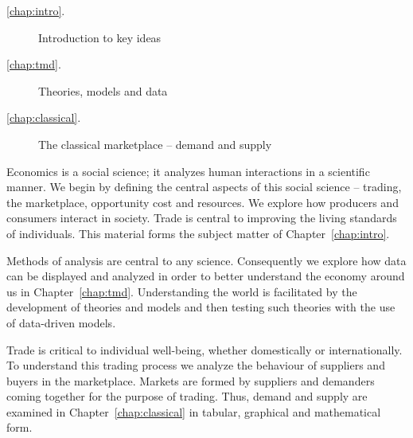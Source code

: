 
{\large\color{parttextcolour}
\begin{description}
\item[\textmd{\ref{chap:intro}.}] Introduction to key ideas

\item[\textmd{\ref{chap:tmd}.}] Theories, models and data

\item[\textmd{\ref{chap:classical}.}] The classical marketplace -- demand and supply
\end{description}
}

\vspace{1cm}

Economics is a social science; it analyzes human interactions in a scientific manner. We begin by defining the central aspects of this social science -- trading, the marketplace, opportunity cost and resources. We explore how producers and consumers interact in society. Trade is central to improving the living standards of individuals. This material forms the subject matter of Chapter~\ref{chap:intro}.

Methods of analysis are central to any science. Consequently we explore how data can be displayed and analyzed in order to better understand the economy around us in Chapter~\ref{chap:tmd}. Understanding the world is facilitated by the development of theories and models and then testing such theories with the use of data-driven models.

Trade is critical to individual well-being, whether domestically or internationally. To understand this trading process we analyze the behaviour of suppliers and buyers in the marketplace. Markets are formed by suppliers and demanders coming together for the purpose of trading. Thus, demand and supply are examined in Chapter~\ref{chap:classical} in tabular, graphical and mathematical form.
